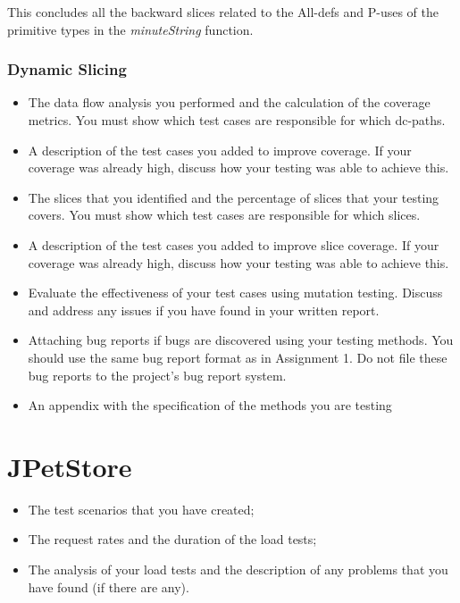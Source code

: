 \documentclass[fontsize=12pt,paper=letter,twoside]{scrartcl}
\begin{document}
This concludes all the backward slices related to the All-defs and P-uses of the primitive types in the \emph{minuteString} function.

\subsubsection{Dynamic Slicing}


\begin{itemize}
\item The data flow analysis you performed and the calculation of the coverage metrics. You must
show which test cases are responsible for which dc-paths.
\item A description of the test cases you added to improve coverage. If your coverage was already high,
discuss how your testing was able to achieve this.
\item The slices that you identified and the percentage of slices that your testing covers. You must
show which test cases are responsible for which slices.
\item A description of the test cases you added to improve slice coverage. If your coverage was
already high, discuss how your testing was able to achieve this.
\item Evaluate the effectiveness of your test cases using mutation testing. Discuss and address any
issues if you have found in your written report.
\item Attaching bug reports if bugs are discovered using your testing methods. You should use the
same bug report format as in Assignment 1. Do not file these bug reports to the project’s bug
report system.
\item An appendix with the specification of the methods you are testing
\end{itemize}

\section{JPetStore}

\begin{itemize}
\item The test scenarios that you have created;
\item The request rates and the duration of the load tests;
\item The analysis of your load tests and the description of any problems that you have found (if there
are any).
\end{itemize}
\end{document}
